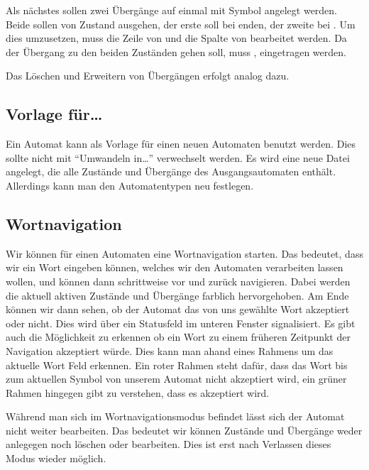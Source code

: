Als nächstes sollen zwei Übergänge auf einmal mit Symbol  angelegt
werden. Beide sollen von Zustand  ausgehen, der erste soll bei
 enden, der zweite bei . Um dies umzusetzen, muss die Zeile
von  und die Spalte von  bearbeitet werden. Da der Übergang
zu den beiden Zuständen gehen soll, muss ,  eingetragen
werden.\vspace{10pt}

Das Löschen und Erweitern von Übergängen erfolgt analog dazu.


\subsection{Vorlage für\ldots}
  
  Ein Automat kann als Vorlage für einen neuen Automaten benutzt werden. Dies
  sollte nicht mit "`Umwandeln in\ldots"' verwechselt werden. Es wird eine neue
  Datei angelegt, die alle Zustände und Übergänge des Ausgangsautomaten enthält.
  Allerdings kann man den Automatentypen neu festlegen.
  
\subsection{Wortnavigation}
  
  Wir können für einen Automaten eine Wortnavigation starten. Das bedeutet, dass
  wir ein Wort eingeben können, welches wir den Automaten verarbeiten lassen
  wollen, und können dann schrittweise vor und zurück navigieren. Dabei
  werden die aktuell aktiven Zustände und Übergänge farblich hervorgehoben. Am Ende können
  wir dann sehen, ob der Automat das von uns gewählte Wort akzeptiert oder
  nicht. Dies wird über ein Statusfeld im unteren Fenster
  signalisiert. Es gibt auch die Möglichkeit zu erkennen ob ein
  Wort zu einem früheren Zeitpunkt der Navigation akzeptiert würde.
  Dies kann man ahand eines Rahmens um das aktuelle Wort Feld
  erkennen. Ein roter Rahmen steht dafür, dass das Wort bis zum
  aktuellen Symbol von unserem Automat nicht akzeptiert wird, ein grüner Rahmen
  hingegen gibt zu verstehen, dass es akzeptiert wird.\vspace{10pt}
  
  Während man sich im Wortnavigationsmodus befindet lässt sich der Automat nicht
  weiter bearbeiten. Das bedeutet wir können Zustände und Übergänge weder
  anlegegen noch löschen oder bearbeiten. Dies ist erst nach Verlassen dieses
  Modus wieder möglich.\vspace{10pt}
  
